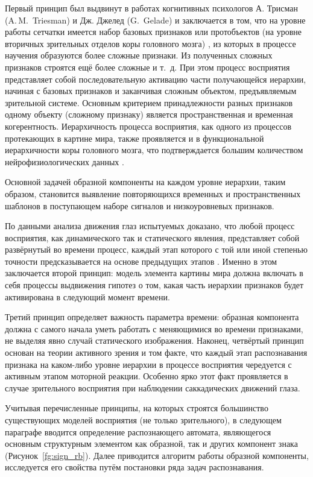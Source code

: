 Первый принцип был выдвинут в работах когнитивных психологов А. Трисман (A.\,M.~Triesman) и Дж. Джелед (G.~Gelade) \cite{Triesman1980} и заключается в том, что на уровне работы сетчатки имеется набор базовых признаков  или протобъектов (на уровне вторичных зрительных отделов коры головного мозга) \cite{Rensink2000}, из которых в процессе научения образуются более сложные признаки. Из полученных сложных признаков строятся ещё более сложные и т.~д. При этом процесс восприятия представляет собой последовательную активацию части получающейся иерархии, начиная с базовых признаков и заканчивая сложным объектом, предъявляемым зрительной системе. Основным критерием принадлежности разных признаков одному объекту (сложному признаку) является пространственная и временная когерентность. Иерархичность процесса восприятия, как одного из процессов протекающих в картине мира, также проявляется и в функциональной иерархичности коры головного мозга, что подтверждается большим количеством нейрофизиологических данных \cite{Hawkins2009, Bolotova2011}.

Основной задачей образной компоненты на каждом уровне иерархии, таким образом, становится выявление повторяющихся временных и пространственных шаблонов в поступающем наборе сигналов и низкоуровневых признаков.

По данными анализа движения глаз испытуемых доказано, что любой процесс восприятия, как динамического так и статического явления, представляет собой развёрнутый во времени процесс, каждый этап которого с той или иной степенью точности предсказывается на основе предыдущих этапов \cite{Velichkovsky2006, Hawkins2009}. Именно в этом заключается второй принцип: модель элемента картины мира должна включать в себя процессы выдвижения гипотез о том, какая часть иерархии признаков будет активирована в следующий момент времени.

Третий принцип определяет важность параметра времени: образная компонента должна с самого начала уметь работать с меняющимися во времени признаками, не выделяя явно случай статического изображения. Наконец, четвёртый принцип основан на теории активного зрения и том факте, что каждый этап распознавания признака на каком-либо уровне иерархии в процессе восприятия чередуется с активным этапом моторной реакции. Особенно ярко этот факт проявляется в случае зрительного восприятия при наблюдении саккадических движений глаза.

Учитывая перечисленные принципы, на которых строятся большинство существующих моделей восприятия (не только зрительного), в следующем параграфе вводится определение распознающего автомата, являющегося основным структурным элементом как образной, так и других компонент знака (Рисунок~\ref{fg:sign_rb}). Далее приводится алгоритм работы образной компоненты, исследуется его свойства путём постановки ряда задач распознавания.

